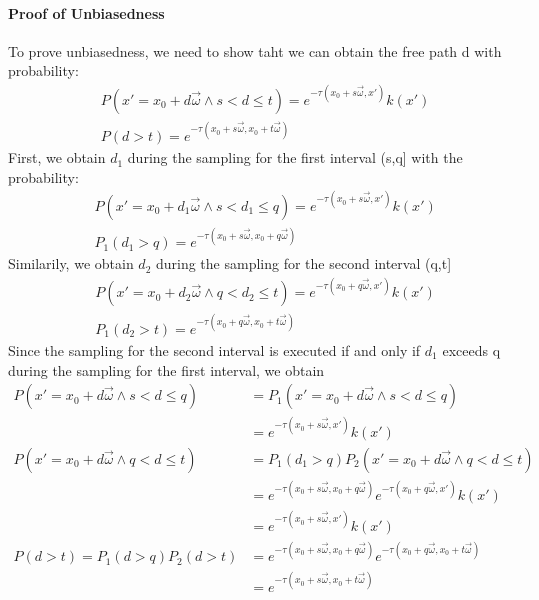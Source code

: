 \documentclass[acmtog]{acmart}
\begin{document}
\paragraph{\textbf{Proof of Unbiasedness}}
To prove unbiasedness, we need to show taht we can obtain the free path d with probability:
\begin{equation}
	\begin{aligned}
		&P(x'=x_0 + d\vec{\omega}\land s<d\leq t) = e^{-\tau(x_0+s\vec{\omega},x')}k(x')\\
		&P(d>t)= e^{-\tau(x_0+s\vec{\omega},x_0+t\vec{\omega})}
	\end{aligned}
\end{equation}
First, we obtain $d_1$ during the sampling for the first interval (s,q] with the probability:
\begin{equation}
	\begin{aligned}
		&P(x'=x_0 + d_1\vec{\omega}\land s<d_1\leq q) = e^{-\tau(x_0+s\vec{\omega},x')}k(x')\\
		&P_1(d_1>q)= e^{-\tau(x_0+s\vec{\omega},x_0+q\vec{\omega})}
	\end{aligned}
\end{equation}
Similarily, we obtain $d_2$ during the sampling for the second interval (q,t]
\begin{equation}
	\begin{aligned}
		&P(x'=x_0 + d_2\vec{\omega}\land q<d_2\leq t) = e^{-\tau(x_0+q\vec{\omega},x')}k(x')\\
		&P_1(d_2>t)= e^{-\tau(x_0+q\vec{\omega},x_0+t\vec{\omega})}
	\end{aligned}
\end{equation}
Since the sampling for the second interval is executed if and only if $d_1$ exceeds q during the sampling for the first interval, we obtain
\begin{equation}
	\begin{aligned}
		P(x'=x_0 + d\vec{\omega}\land s<d\leq q)
		&=P_1(x'=x_0 + d\vec{\omega}\land s<d\leq q)\\
		&= e^{-\tau(x_0+s\vec{\omega},x')}k(x')\\
		P(x'=x_0 + d\vec{\omega}\land q<d\leq t)
		&=P_1(d_1>q)P_2(x'=x_0 + d\vec{\omega}\land q<d\leq t)\\
	&=e^{-\tau(x_0+s\vec{\omega},x_0+q\vec{\omega})}e^{-\tau(x_0+q\vec{\omega},x')}k(x')\\
		&=e^{-\tau(x_0+s\vec{\omega},x')}k(x')\\
		P(d>t) = P_1(d>q)P_2(d>t)
		&=e^{-\tau(x_0+s\vec{\omega},x_0+q\vec{\omega})}e^{-\tau(x_0+q\vec{\omega},x_0+t\vec{\omega})}\\
		&=e^{-\tau(x_0+s\vec{\omega},x_0+t\vec{\omega})}
		\end{aligned}
\end{equation}
\end{document}
